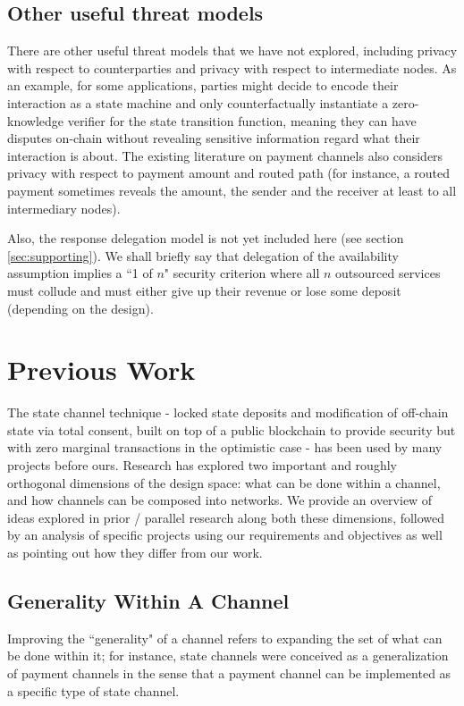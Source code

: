 \documentclass[prb,floatfix,reprint,nofootinbib,amsmath,amssymb,epsfig,pre,floats,letterpaper,groupedaffiliation,tightenlines,allcolors=blue,11pt]{revtex4}
\theoremstyle{definition}
\theoremstyle{definition}
\theoremstyle{definition}
\begin{document}
\subsection{Other useful threat models}

There are other useful threat models that we have not explored, including privacy with respect to counterparties and privacy with respect to intermediate nodes. As an example, for some applications, parties might decide to encode their interaction as a state machine and only counterfactually instantiate a zero-knowledge verifier for the state transition function, meaning they can have disputes on-chain without revealing sensitive information regard what their interaction is about. The existing literature on payment channels also considers privacy with respect to payment amount and routed path (for instance, a routed payment sometimes reveals the amount, the sender and the receiver at least to all intermediary nodes).

Also, the response delegation model is not yet included here (see section \ref{sec:supporting}). We shall briefly say that delegation of the availability assumption implies a ``1 of $n$" security criterion where all $n$ outsourced services must collude and must either give up their revenue or lose some deposit (depending on the design).

\section{Previous Work}

The state channel technique - locked state deposits and modification of off-chain state via total consent, built on top of a public blockchain to provide security but with zero marginal transactions in the optimistic case - has been used by many projects before ours. Research has explored two important and roughly orthogonal dimensions of the design space: what can be done within a channel, and how channels can be composed into networks. We provide an overview of ideas explored in prior / parallel research along both these dimensions, followed by an analysis of specific projects using our requirements and objectives as well as pointing out how they differ from our work.

\subsection{Generality Within A Channel}

Improving the ``generality" of a channel refers to expanding the set of what can be done within it; for instance, state channels were conceived as a generalization of payment channels in the sense that a payment channel can be implemented as a specific type of state channel.
\end{document}
